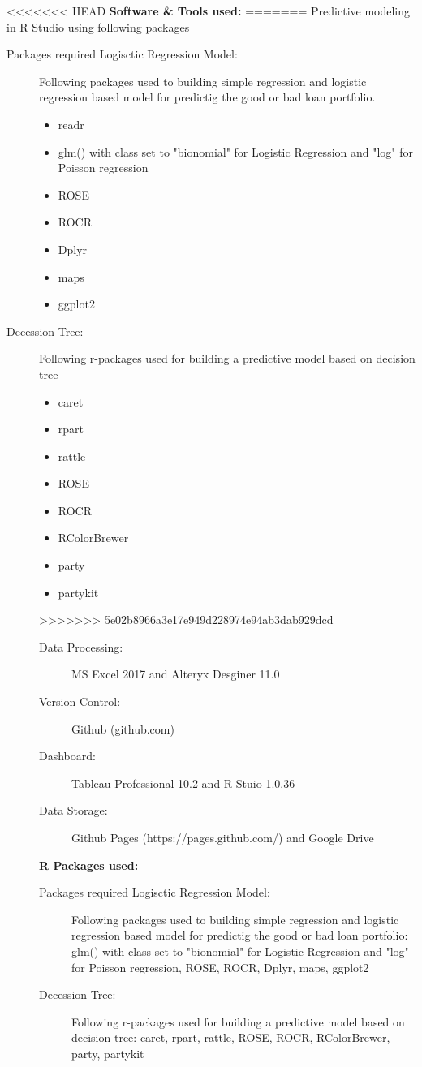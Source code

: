 <<<<<<< HEAD
\textbf{Software \& Tools used:}
=======
Predictive modeling in R Studio using following packages
\begin{description}
  \item[Packages required Logisctic Regression Model:] Following packages used to building simple regression and logistic regression based model for predictig the good or bad loan portfolio.
   \begin{itemize}
        \item readr
        \item glm() with class set to "bionomial" for Logistic Regression and "log" for Poisson regression
        \item ROSE 
        \item ROCR
        \item Dplyr
        \item maps
        \item ggplot2
    \end{itemize}
  \item[Decession Tree:] Following r-packages used for building a predictive model based on decision tree
    \begin{itemize}
        \item caret
        \item rpart
        \item rattle
        \item ROSE
        \item ROCR
        \item RColorBrewer
        \item party
        \item partykit
    \end{itemize}
>>>>>>> 5e02b8966a3e17e949d228974e94ab3dab929dcd

\begin{description}
  \item[Data Processing:] MS Excel 2017 and Alteryx Desginer 11.0
  \item[Version Control:] Github (github.com)
  \item[Dashboard:] Tableau Professional 10.2 and R Stuio 1.0.36
  \item[Data Storage:] Github Pages (https://pages.github.com/) and Google Drive
\end{description}

\textbf{R Packages used:}\\

\begin{description}
  \item[Packages required Logisctic Regression Model:] Following packages used to building simple regression and logistic regression based model for predictig the good or bad loan portfolio: glm() with class set to "bionomial" for Logistic Regression and "log" for Poisson regression, ROSE, ROCR, Dplyr, maps, ggplot2
  \item[Decession Tree:] Following r-packages used for building a predictive model based on decision tree: caret, rpart, rattle, ROSE, ROCR, RColorBrewer, party, partykit


\end{description}
\end{description}
